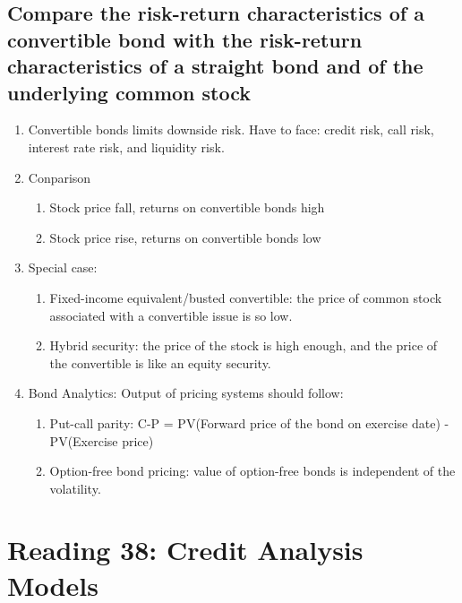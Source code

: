 \documentclass{article}
\newcommand{\be}{\begin{enumerate}}
\newcommand{\ee}{\end{enumerate}}
\begin{document}
\subsection{Compare the risk-return characteristics of a convertible bond with the 
risk-return characteristics of a straight bond and of the underlying common stock}
\be
    \item Convertible bonds limits downside risk. Have to face: credit risk, call risk, 
    interest rate risk, and liquidity risk.
    \item Conparison
        \be
            \item Stock price fall, returns on convertible bonds high
            \item Stock price rise, returns on convertible bonds low
        \ee
    \item Special case:
        \be
            \item Fixed-income equivalent/busted convertible: the price of common stock associated with
    a convertible issue is so low.
            \item Hybrid security: the price of the stock is high enough, and the price of 
            the convertible is like an equity security.
        \ee
    \item Bond Analytics: Output of pricing systems should follow:
        \be
            \item Put-call parity: C-P = PV(Forward price of the bond on exercise date) - PV(Exercise price)
            \item Option-free bond pricing: value of option-free bonds is independent of the volatility.
        \ee
\ee

\section{Reading 38: Credit Analysis Models}
\end{document}
